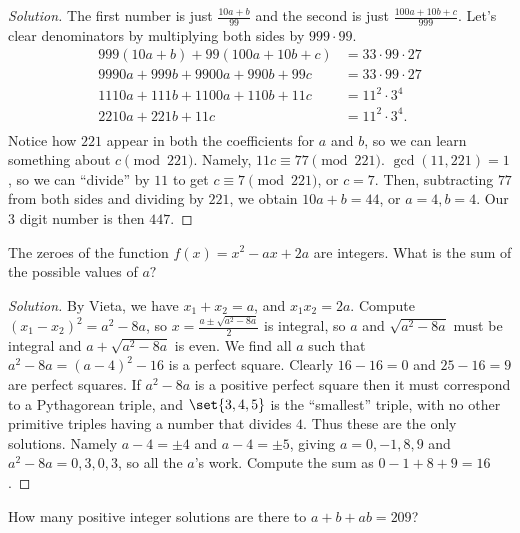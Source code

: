 \ifsolutions
\begin{proof}[Solution]
The first number is just $\frac{10a + b}{99}$ and the second is just $\frac{100a
+ 10b + c}{999}$. Let's clear denominators by multiplying both sides by $999
\cdot 99$.
\[ \begin{aligned}
999 (10a + b) + 99 (100a + 10b + c) &= 33 \cdot 99 \cdot 27 \\
9990a + 999b + 9900a + 990b + 99c &= 33 \cdot 99 \cdot 27 \\
1110a + 111b + 1100a + 110b + 11c &= 11^2 \cdot 3^4 \\
2210a + 221b + 11c &= 11^2 \cdot 3^4. \\
\end{aligned} \]
Notice how $221$ appear in both the coefficients for $a$ and $b$, so we can
learn something about $c \pmod{221}$. Namely, $11c \equiv 77 \pmod{221}$.
$\gcd(11, 221) = 1$, so we can ``divide'' by $11$ to get $c \equiv 7
\pmod{221}$, or $c = 7$. Then, subtracting $77$ from both sides and dividing by
$221$, we obtain $10a + b = 44$, or $a = 4, b = 4$. Our $3$ digit number is then
$\boxed{447}$.
\end{proof}
\fi

\begin{prb}[2015 AMC 10A-23]
The zeroes of the function $f(x) = x^2 - ax + 2a$ are integers. What is the sum
of the possible values of $a?$
\end{prb}

\ifsolutions
\begin{proof}[Solution]
By Vieta, we have $x_1 + x_2 = a$, and $x_1 x_2 = 2a$. Compute $(x_1 - x_2)^2 =
a^2 - 8a$, so $x = \frac{a \pm \sqrt{a^2 - 8a}}{2}$ is integral, so $a$ and
$\sqrt{a^2 - 8a}$ must be integral and $a + \sqrt{a^2 - 8a}$ is even. We find
all $a$ such that $a^2 - 8a = (a - 4)^2 - 16$ is a perfect square. Clearly $16 -
16 = 0$ and $25 - 16 = 9$ are perfect squares. If $a^2 - 8a$ is a positive
perfect square then it must correspond to a Pythagorean triple, and $\set{3, 4,
5}$ is the ``smallest'' triple, with no other primitive triples having a number
that divides $4$. Thus these are the only solutions. Namely $a - 4 = \pm 4$ and
$a - 4 = \pm 5$, giving $a = 0, -1, 8, 9$ and $a^2 - 8a = 0, 3, 0, 3$, so all
the $a$'s work. Compute the sum as $0 - 1 + 8 + 9 = \boxed{16}$.
\end{proof}
\fi

\begin{prb}
How many positive integer solutions are there to $a + b + ab = 209$?
\end{prb}


